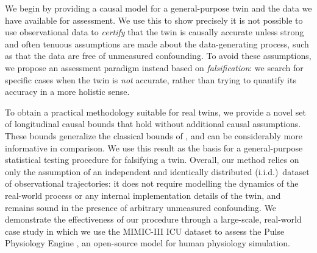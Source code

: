 We begin by providing a causal model for a general-purpose twin and the data we have available for assessment.
We use this to show precisely it is not possible to use observational data to \emph{certify} that the twin is causally accurate unless strong and often tenuous assumptions are made about the data-generating process, such as that the data are free of unmeasured confounding.
To avoid these assumptions, we propose an assessment paradigm instead based on \emph{falsification}: we search for specific cases when the twin is \emph{not} accurate, rather than trying to quantify its accuracy in a more holistic sense. %

To obtain a practical methodology suitable for real twins, we provide a novel set of longitudinal causal bounds that hold without additional causal assumptions.
These bounds generalize the classical bounds of \cite{manski}, and can be considerably more informative in comparison.
We use this result as the basis for a general-purpose statistical testing procedure for falsifying a twin.
Overall, our method relies on only the assumption of an independent and identically distributed (i.i.d.)\ dataset of observational trajectories: it does not require modelling the dynamics of the real-world process or any internal implementation details of the twin, and remains sound in the presence of arbitrary unmeasured confounding. %
We demonstrate the effectiveness of our procedure through a large-scale, real-world case study in which we use the MIMIC-III ICU dataset \citep{mimic} to assess the Pulse Physiology Engine \citep{pulse}, an open-source model for human physiology simulation.

